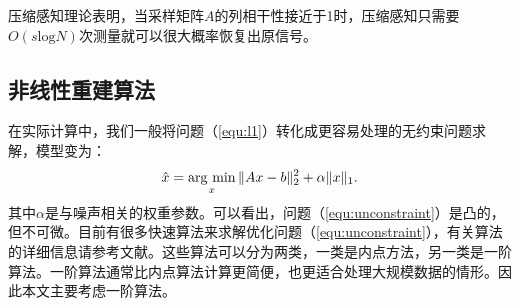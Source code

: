 压缩感知理论表明，当采样矩阵$A$的列相干性接近于1时，压缩感知只需要$O(s\mathrm{log}N)$次测量就可以很大概率恢复出原信号。

\subsection{非线性重建算法}
在实际计算中，我们一般将问题（\ref{equ:l1}）转化成更容易处理的无约束问题求解，模型变为：
\begin{equation}
	\hat{x}=\argmin_x \|Ax-b\|_2^2 + \alpha\|x\|_1.
	\label{equ:unconstraint}
\end{equation}
其中$\alpha$是与噪声相关的权重参数。可以看出，问题（\ref{equ:unconstraint}）是凸的，但不可微。目前有很多快速算法来求解优化问题（\ref{equ:unconstraint}），有关算法的详细信息请参考文献\cite{proximal}。这些算法可以分为两类，一类是内点方法，另一类是一阶算法。一阶算法通常比内点算法计算更简便，也更适合处理大规模数据的情形。因此本文主要考虑一阶算法。

